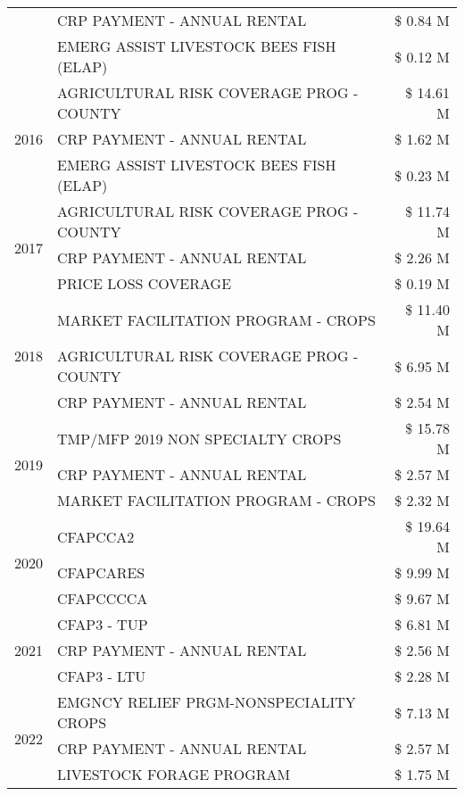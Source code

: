 \begin{tabular}{llr}
 & CRP PAYMENT - ANNUAL RENTAL & \$ 0.84 M \\
 & EMERG ASSIST LIVESTOCK BEES FISH (ELAP) & \$ 0.12 M \\
\cline{1-3}
\multirow[t]{3}{*}{2016} & AGRICULTURAL RISK COVERAGE PROG - COUNTY & \$ 14.61 M \\
 & CRP PAYMENT - ANNUAL RENTAL & \$ 1.62 M \\
 & EMERG ASSIST LIVESTOCK BEES FISH (ELAP) & \$ 0.23 M \\
\cline{1-3}
\multirow[t]{3}{*}{2017} & AGRICULTURAL RISK COVERAGE PROG - COUNTY & \$ 11.74 M \\
 & CRP PAYMENT - ANNUAL RENTAL & \$ 2.26 M \\
 & PRICE LOSS COVERAGE & \$ 0.19 M \\
\cline{1-3}
\multirow[t]{3}{*}{2018} & MARKET FACILITATION PROGRAM - CROPS & \$ 11.40 M \\
 & AGRICULTURAL RISK COVERAGE PROG - COUNTY & \$ 6.95 M \\
 & CRP PAYMENT - ANNUAL RENTAL & \$ 2.54 M \\
\cline{1-3}
\multirow[t]{3}{*}{2019} & TMP/MFP 2019 NON SPECIALTY CROPS & \$ 15.78 M \\
 & CRP PAYMENT - ANNUAL RENTAL & \$ 2.57 M \\
 & MARKET FACILITATION PROGRAM - CROPS & \$ 2.32 M \\
\cline{1-3}
\multirow[t]{3}{*}{2020} & CFAPCCA2 & \$ 19.64 M \\
 & CFAPCARES & \$ 9.99 M \\
 & CFAPCCCCA & \$ 9.67 M \\
\cline{1-3}
\multirow[t]{3}{*}{2021} & CFAP3 - TUP & \$ 6.81 M \\
 & CRP PAYMENT - ANNUAL RENTAL & \$ 2.56 M \\
 & CFAP3 - LTU & \$ 2.28 M \\
\cline{1-3}
\multirow[t]{3}{*}{2022} & EMGNCY RELIEF PRGM-NONSPECIALITY CROPS & \$ 7.13 M \\
 & CRP PAYMENT - ANNUAL RENTAL & \$ 2.57 M \\
 & LIVESTOCK FORAGE PROGRAM & \$ 1.75 M \\
\cline{1-3}
\bottomrule
\end{tabular}
